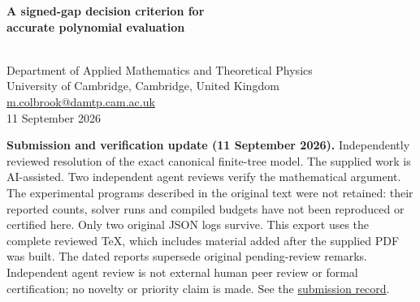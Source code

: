 \documentclass[11pt,a4paper]{article}
\theoremstyle{definition}
\theoremstyle{remark}
\begin{document}
\begin{center}
{\LARGE\bfseries A signed-gap decision criterion for\\[3pt] accurate polynomial evaluation}
\par{}\\[3pt]{\small Department of Applied Mathematics and Theoretical Physics}\\{\small University of Cambridge, Cambridge, United Kingdom}\\{\small\href{mailto:m.colbrook@damtp.cam.ac.uk}{m.colbrook@damtp.cam.ac.uk}}\\[5pt]{\small 11 September 2026}
\end{center}
\noindent\textbf{Submission and verification update (11 September 2026).} Independently reviewed resolution of the exact canonical finite-tree model. The supplied work is AI-assisted. Two independent agent reviews verify the mathematical argument. The experimental programs described in the original text were not retained: their reported counts, solver runs and compiled budgets have not been reproduced or certified here. Only two original JSON logs survive. This export uses the complete reviewed TeX, which includes material added after the supplied PDF was built. The dated reports supersede original pending-review remarks. Independent agent review is not external human peer review or formal certification; no novelty or priority claim is made. See the \href{https://github.com/MColbrook/OpenProblemsInNLA/tree/codex/colbrook-arithmetic-submissions/references/colbrook-arithmetic-2026-09-11}{submission record}.
\par\medskip

\vspace{0.3em}
\begin{abstract}
A finite criterion is proposed for the existence of accurate evaluation algorithms
for real polynomials in the constant-free, independently rounded arithmetic model.
For each ordering of the input magnitudes and each choice of their signs, write
the inputs as signed cumulative sums of nonnegative gaps. Expand the given
polynomial in these gaps. The criterion requires that the polynomial obtained
by taking the absolute values of its coefficients be bounded by a constant times
the absolute value of the polynomial itself, on the entire nonnegative orthant.
The proof below establishes necessity by constructing a separated execution of
an arbitrary finite branching program, then replaying it under multiplicative
gap perturbations while holding every rounded value fixed. Polynomial
interpolation yields coefficient domination. Sufficiency follows from direct
evaluation in gap coordinates. The criterion is a finite collection of
first-order sentences over the reals, so real quantifier elimination gives an
always-halting decision procedure for AA-01. Stored values, exact negation,
equality branches, nonhomogeneous polynomials, and boundary points are included.
\end{abstract}
\end{document}
